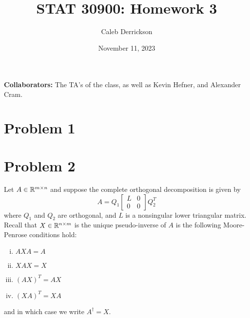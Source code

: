 

\title{STAT 30900: Homework 3}
\author{Caleb Derrickson}
\date{November 11, 2023}


\onehalfspacing
\maketitle
\allowdisplaybreaks
{\color{cit}\vspace{2mm}\noindent\textbf{Collaborators:}} The TA's of the class, as well as Kevin Hefner, and Alexander Cram.

\tableofcontents

\newpage
\section{Problem 1}


\newpage
\section{Problem 2}
Let $A \in \mathbb{R}^{m \times n}$ and suppose the complete orthogonal decomposition is given by
\[
A = Q_1 \begin{bmatrix}L &0\\0&0\end{bmatrix}Q_2^T
\]
where $Q_1$ and $Q_2$ are orthogonal, and $L$ is a nonsingular lower triangular matrix. Recall that $X \in \mathbb{R}^{n \times m}$ is the unique pseudo-inverse of $A$ is the following Moore-Penrose conditions hold:
\begin{enumerate}[(i)]
    \item $AXA = A$ 
    \item $XAX = X$ 
    \item $(AX)^T = AX$ 
    \item $(XA)^T = XA$
\end{enumerate}
and in which case we write $A^\dag = X$.
